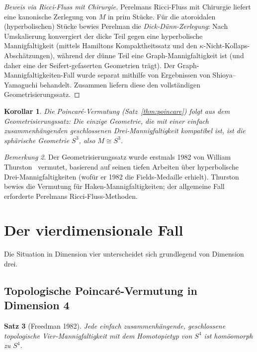 \documentclass[12pt,a4paper]{amsart}
\newtheorem{theorem}{Satz}[section]
\newtheorem{korollar}[theorem]{Korollar}
\theoremstyle{definition}
\theoremstyle{remark}
\newtheorem{bemerkung}[theorem]{Bemerkung}
\begin{document}
\begin{proof}[Beweis via Ricci-Fluss mit Chirurgie]
Perelmans Ricci-Fluss mit Chirurgie liefert eine kanonische Zerlegung von
$M$ in prim Stücke.  Für die atoroidalen (hyperbolischen) Stücke bewies
Perelman die \emph{Dick-Dünn-Zerlegung}: Nach Umskalierung konvergiert der
dicke Teil gegen eine hyperbolische Mannigfaltigkeit (mittels Hamiltons
Kompaktheitssatz und den $\kappa$-Nicht-Kollaps-Abschätzungen), während der
dünne Teil eine Graph-Mannigfaltigkeit ist (und daher eine der
Seifert-gefaserten Geometrien trägt).  Der Graph-Mannigfaltigkeiten-Fall
wurde separat mithilfe von Ergebnissen von Shioya--Yamaguchi behandelt.
Zusammen liefern diese den vollständigen Geometrisierungssatz.
\end{proof}

\begin{korollar}
Die Poincaré-Vermutung (Satz~\ref{thm:poincare}) folgt aus dem
Geometrisierungssatz: Die einzige Geometrie, die mit einer einfach
zusammenhängenden geschlossenen Drei-Mannigfaltigkeit kompatibel ist, ist die
sphärische Geometrie $S^3$, also $M \cong S^3$.
\end{korollar}

\begin{bemerkung}
Der Geometrisierungssatz wurde erstmals 1982 von William
Thurston~\cite{Thurston1982} vermutet, basierend auf seinen tiefen Arbeiten
über hyperbolische Drei-Mannigfaltigkeiten (wofür er 1982 die Fields-Medaille
erhielt).  Thurston bewies die Vermutung für Haken-Mannigfaltigkeiten; der
allgemeine Fall erforderte Perelmans Ricci-Fluss-Methoden.
\end{bemerkung}


\section{Der vierdimensionale Fall}
\label{sec:4d}

Die Situation in Dimension vier unterscheidet sich grundlegend von Dimension
drei.

\subsection{Topologische Poincaré-Vermutung in Dimension 4}

\begin{theorem}[Freedman 1982]
\label{thm:freedman}
Jede einfach zusammenhängende, geschlossene topologische Vier-Mannigfaltigkeit
mit dem Homotopietyp von $S^4$ ist homöomorph zu $S^4$.
\end{theorem}
\end{document}
